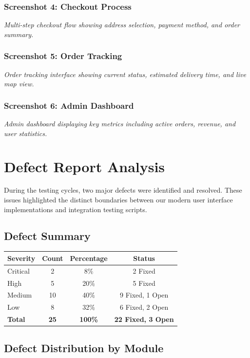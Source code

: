 \documentclass[12pt,a4paper]{report}
\begin{document}
\subsection*{Screenshot 4: Checkout Process}
\textit{Multi-step checkout flow showing address selection, payment method, and order summary.}

\subsection*{Screenshot 5: Order Tracking}
\textit{Order tracking interface showing current status, estimated delivery time, and live map view.}

\subsection*{Screenshot 6: Admin Dashboard}
\textit{Admin dashboard displaying key metrics including active orders, revenue, and user statistics.}

\chapter{Defect Report Analysis}

During the testing cycles, two major defects were identified and resolved. These issues highlighted the distinct boundaries between our modern user interface implementations and integration testing scripts.

\section{Defect Summary}

\begin{longtable}{|l|c|c|c|}
\hline
\textbf{Severity} & \textbf{Count} & \textbf{Percentage} & \textbf{Status} \\
\hline
\endfirsthead
Critical & 2 & 8\% & 2 Fixed \\
\hline
High & 5 & 20\% & 5 Fixed \\
\hline
Medium & 10 & 40\% & 9 Fixed, 1 Open \\
\hline
Low & 8 & 32\% & 6 Fixed, 2 Open \\
\hline
\textbf{Total} & \textbf{25} & \textbf{100\%} & \textbf{22 Fixed, 3 Open} \\
\hline
\end{longtable}

\section{Defect Distribution by Module}
\end{document}

